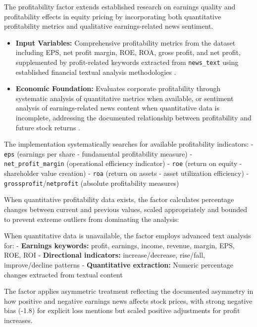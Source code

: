 \documentclass[3p,times,procedia]{elsarticle}
\begin{document}
The profitability factor extends established research on earnings quality and profitability effects in equity pricing \cite{Zhang2006} by incorporating both quantitative profitability metrics and qualitative earnings-related news sentiment.

\begin{itemize}
    \item \textbf{Input Variables:} Comprehensive profitability metrics from the dataset \cite{FinReportDataset2025} including EPS, net profit margin, ROE, ROA, gross profit, and net profit, supplemented by profit-related keywords extracted from \texttt{news\_text} using established financial textual analysis methodologies \cite{Loughran2011}.
    \item \textbf{Economic Foundation:} Evaluates corporate profitability through systematic analysis of quantitative metrics when available, or sentiment analysis of earnings-related news content when quantitative data is incomplete, addressing the documented relationship between profitability and future stock returns \cite{Zhang2006}.
\end{itemize}

The implementation systematically searches for available profitability indicators:
- \texttt{eps} (earnings per share - fundamental profitability measure)
- \texttt{net\_profit\_margin} (operational efficiency indicator)
- \texttt{roe} (return on equity - shareholder value creation)
- \texttt{roa} (return on assets - asset utilization efficiency)
- \texttt{grossprofit}/\texttt{netprofit} (absolute profitability measures)

When quantitative profitability data exists, the factor calculates percentage changes between current and previous values, scaled appropriately and bounded to prevent extreme outliers from dominating the analysis:

When quantitative data is unavailable, the factor employs advanced text analysis for:
- \textbf{Earnings keywords:} profit, earnings, income, revenue, margin, EPS, ROE, ROI
- \textbf{Directional indicators:} increase/decrease, rise/fall, improve/decline patterns
- \textbf{Quantitative extraction:} Numeric percentage changes extracted from textual content

The factor applies asymmetric treatment reflecting the documented asymmetry in how positive and negative earnings news affects stock prices, with strong negative bias (-1.8) for explicit loss mentions but scaled positive adjustments for profit increases.
\end{document}
